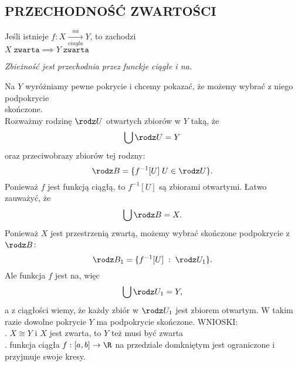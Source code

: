\subsection{PRZECHODNOŚĆ ZWARTOŚCI}
\begin{center}\large
    Jeśli istnieje $f:X\xrightarrow[ciagla]{na} Y$, to zachodzi\smallskip\\
    $X\;\texttt{zwarta}\implies Y\;\texttt{zwarta}$\bigskip

    \emph{\normalsize{\color{def}Zbieżność jest przechodnia przez funckje ciągłe i na}.}
\end{center}
\dowod
Na $Y$ wyróżniamy pewne pokrycie i chcemy pokazać, że możemy wybrać z niego podpokrycie \\skończone.\medskip\\
Rozważmy rodzinę $\rodz U$ otwartych zbiorów w $Y$ taką, że
$$\bigcup\rodz U=Y$$
oraz przeciwobrazy zbiorów tej rodzny:
$$\rodz B=\{f^{-1}[U]\;U\in\rodz U\}.$$
Ponieważ $f$ jest funkcją ciągłą, to $f^{-1}[U]$ są zbiorami otwartymi. Łatwo zauważyć, że
$$\bigcup \rodz B=X.$$
Ponieważ $X$ jest przestrzenią zwartą, możemy wybrać skończone podpokrycie z $\rodz B$: 
$$\rodz B_1=\{f^{-1}[U]\;:\;\rodz U_1\}.$$
Ale funkcja $f$ jest na, więc
$$\bigcup\rodz U_1=Y,$$
a z ciągłości wiemy, że każdy zbiór w $\rodz U_1$ jest zbiorem otwartym. W takim razie dowolne pokrycie $Y$ ma podpokrycie skończone.
\kondow
{\large\color{acc}WNIOSKI:}\medskip\\
. $X\cong Y$ i $X$ jest zwarta, to $Y$ też musi być zwarta\smallskip\\
. funkcja ciągła $f:[a,b]\to \R$ na przedziale domkniętym jest ograniczone i przyjmuje swoje kresy.\bigskip\\
\bigskip

